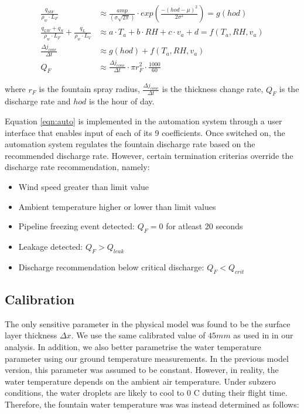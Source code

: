 \documentclass[tc, manuscript]{copernicus}
\begin{document}
\begin{subequations}
	\begin{align}
		\label{eqn:sun}
  \frac{q_{SW}}{\rho_w \cdot L_F} & \approx \frac{amp}{(\sigma \sqrt{2\pi})} \cdot
  exp\left(\frac{-(hod-\mu)^2}{2\sigma^2}\right) = g(hod)  \\
		\label{eqn:T}
   \frac{q_{LW} + q_{S}}{\rho_w \cdot L_F} + \frac{q_L}{\rho_w \cdot L_V} & \approx a \cdot T_a + b \cdot RH + c \cdot v_a +
  d = f(T_a, RH, v_a) \\
		\label{eqn:temp}
  \frac{\Delta j_{cone}}{\Delta t} & \approx g(hod) + f(T_a, RH, v_a)\\
		\label{eqn:auto}
  Q_{F} & \approx \frac{\Delta j_{cone}}{\Delta t} \cdot \pi r_{F}^2 \cdot
  \frac{1000}{60}
	\end{align}
\end{subequations}

where $r_F$ is the fountain spray radius, $\frac{\Delta j_{cone}}{\Delta t}$ is the thickness change rate,
$Q_{F}$ is the discharge rate and $hod$ is the hour of day.

Equation \ref{eqn:auto} is implemented in the automation system through a user interface that enables input of
each of its 9 coefficients. Once switched on, the automation system regulates the fountain discharge rate based
on the recommended discharge rate. However, certain termination criterias override the discharge rate
recommendation, namely: 

\begin{itemize}
\item Wind speed greater than limit value
\item Ambient temperature higher or lower than limit values
\item Pipeline freezing event detected: $Q_F = 0$ for atleast 20 seconds
\item Leakage detected: $Q_F > Q_{leak}$
\item Discharge recommendation below critical discharge: $Q_F < Q_{crit}$
\end{itemize}

\subsection{Calibration}
The only sensitive parameter in the physical model was found to be the surface layer thickness $\Delta x$. We
use the same calibrated value of $45 mm$ as used in \cite{balasubramanianInfluenceMeteorologicalConditions2022}
in our analysis. In addition, we also better parametrise the water temperature parameter using our ground
temperature measurements. In the previous model version, this parameter was assumed to be constant. However, in
reality, the water temperature depends on the ambient air temperature. Under subzero conditions, the water
droplets are likely to cool to 0 C duting their flight time. Therefore, the fountain water temperature was
was instead determined as follows:
\end{document}
